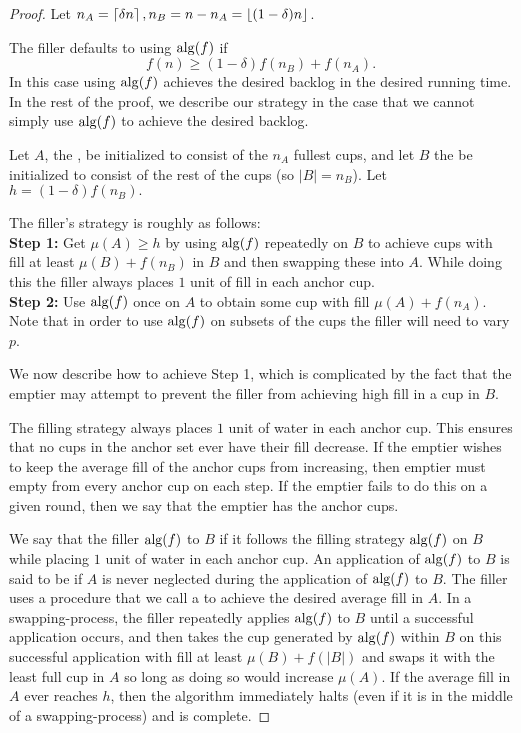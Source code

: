\begin{proof}
  Let $n_A = \left\lceil \delta n \right\rceil, n_B = n-n_A = \left\lfloor (1-\delta) n \right\rfloor$.

  The filler defaults to using $\operatorname{\text{\textup{alg}}}(f)$ if 
  $$f(n) \ge (1-\delta)f(n_B) + f(n_A).$$ 
  In this case using $\operatorname{\text{\textup{alg}}}(f)$ achieves the desired backlog in
  the desired running time. In the rest of the proof, we describe
  our strategy in the case that we cannot simply use $\operatorname{\text{\textup{alg}}}(f)$ to
  achieve the desired backlog. 

  Let $A$, the , be initialized to consist of
  the $n_A$ fullest cups, and let $B$ the
   be initialized to consist of the rest of
  the cups (so $|B| = n_B$). Let $h = (1-\delta)f(n_B).$

  The filler's strategy is roughly as follows: \\
  \textbf{Step 1:} Get $\mu(A) \ge h$ by using $\operatorname{\text{\textup{alg}}}(f)$
  repeatedly on $B$ to achieve cups with fill at least $\mu(B) +
  f(n_B)$ in $B$ and then swapping these into $A$. While doing
  this the filler always places $1$ unit of fill in each anchor
  cup.\\
  \textbf{Step 2:} Use $\operatorname{\text{\textup{alg}}}(f)$ once on $A$ to obtain some cup
  with fill $\mu(A)+f(n_A)$.\\
  Note that in order to use $\operatorname{\text{\textup{alg}}}(f)$ on subsets of the cups the
  filler will need to vary $p$.

  We now describe how to achieve Step 1, which is
  complicated by the fact that the emptier may attempt to
  prevent the filler from achieving high fill in a cup
  in $B$.

  The filling strategy always places $1$ unit of water in each
  anchor cup. This ensures that no cups in the anchor set ever
  have their fill decrease. If the emptier wishes to keep the
  average fill of the anchor cups from increasing, then emptier
  must empty from every anchor cup on each step. If the emptier
  fails to do this on a given round, then we say that the emptier
  has  the anchor cups. 

  We say that the filler  $\operatorname{\text{\textup{alg}}}(f)$ to $B$ if it
  follows the filling strategy $\operatorname{\text{\textup{alg}}}(f)$ on $B$ while placing $1$
  unit of water in each anchor cup. An application of $\operatorname{\text{\textup{alg}}}(f)$
  to $B$ is said to be  if $A$ is never
  neglected during the application of $\operatorname{\text{\textup{alg}}}(f)$ to $B$. The
  filler uses a procedure that we call a 
  to achieve the desired average fill in $A$. In a
  swapping-process, the filler repeatedly applies $\operatorname{\text{\textup{alg}}}(f)$ to
  $B$ until a successful application occurs, and then takes the
  cup generated by $\operatorname{\text{\textup{alg}}}(f)$ within $B$ on this successful
  application with fill at least $\mu(B) + f(|B|)$ and swaps it
  with the least full cup in $A$ so long as doing so would
  increase $\mu(A)$. If the average fill in $A$ ever reaches $h$,
  then the algorithm immediately halts (even if it is in the
  middle of a swapping-process) and is complete.


\end{proof}

